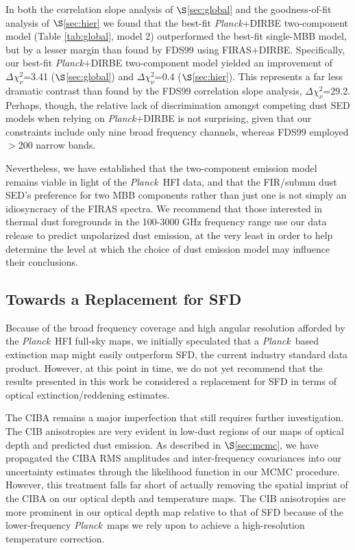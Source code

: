 \documentclass{emulateapj}
\newcommand{\PLANCK}{{\it Planck}}
\begin{document}
In both the correlation slope analysis of $\S$\ref{sec:global} and the 
goodness-of-fit analysis of $\S$\ref{sec:hier} we found that the 
best-fit \PLANCK+DIRBE two-component model (Table \ref{tab:global}, model 2) 
outperformed the best-fit single-MBB model, but by a lesser margin than found 
by FDS99 using FIRAS+DIRBE. Specifically, our best-fit \PLANCK+DIRBE 
two-component model yielded an improvement of $\Delta \chi^2_{\nu}$=3.41 
($\S$\ref{sec:global}) and $\Delta \chi^2_{\nu}$=0.4 ($\S$\ref{sec:hier}). This
represents a far less dramatic contrast than found by the FDS99 correlation 
slope analysis, $\Delta \chi^2_{\nu}$=29.2. Perhaps, though, the relative lack 
of discrimination amongst competing dust SED models when relying on 
\PLANCK+DIRBE is not surprising, given that our constraints include only nine 
broad frequency channels, whereas FDS99 employed $>$200 narrow bands.


Nevertheless, we have established that the two-component emission model
remains viable in light of the \PLANCK~HFI data, and that the FIR/submm 
dust SED's preference for two MBB components rather than just one is not
simply an idiosyncracy of the FIRAS spectra. We recommend that those interested
in thermal dust foregrounds in the 100-3000 GHz frequency range use our data 
release to predict unpolarized dust emission, at the very least in order to 
help determine the level at which the choice of dust emission model may 
influence their conclusions.


\subsection{Towards a Replacement for SFD}
\label{sec:replace}
Because of the broad frequency coverage and high angular resolution afforded
by the \PLANCK~HFI full-sky maps, we initially speculated that a \PLANCK~based 
extinction map might easily outperform SFD, the current industry standard data 
product. However, at this point in time, we do not yet recommend that the 
results presented in this work be considered a replacement for SFD in terms of 
optical extinction/reddening estimates.

The CIBA remains a major imperfection that still requires further 
investigation. The CIB anisotropies are very evident in low-dust regions of our
maps of optical depth and predicted dust emission. As described in 
$\S$\ref{sec:mcmc}, we have propagated the CIBA RMS amplitudes and 
inter-frequency covariances into our uncertainty estimates through the 
likelihood function in our MCMC procedure. However, this treatment falls far 
short of actually removing the spatial imprint of the CIBA on our optical depth
and temperature maps. The CIB anisotropies are more prominent in our optical 
depth map relative to that of SFD because of the lower-frequency \PLANCK~maps 
we rely upon to achieve a high-resolution temperature correction.
\end{document}
